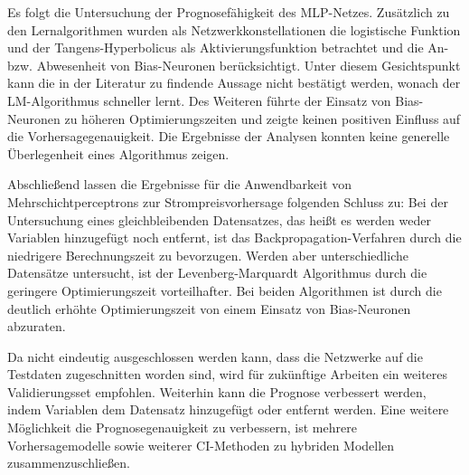 \begin{sloppypar}
Es folgt die Untersuchung der Prognosefähigkeit des MLP-Netzes. Zusätzlich zu den Lernalgorithmen wurden als Netzwerkkonstellationen die logistische Funktion und der Tangens-Hyperbolicus als Aktivierungsfunktion betrachtet und die An- bzw. Abwesenheit von Bias-Neuronen berücksichtigt. Unter diesem Gesichtspunkt kann die in der Literatur zu findende Aussage nicht bestätigt werden, wonach der LM-Algorithmus schneller lernt. Des Weiteren führte der Einsatz von Bias-Neuronen zu höheren Optimierungszeiten und zeigte keinen positiven Einfluss auf die Vorhersagegenauigkeit. Die Ergebnisse der Analysen konnten keine generelle Überlegenheit eines Algorithmus zeigen.\par\medskip  %

\newpage

Abschließend lassen die Ergebnisse für die Anwendbarkeit von Mehrschichtperceptrons zur Strompreisvorhersage folgenden Schluss zu: Bei der Untersuchung eines gleichbleibenden Datensatzes, das heißt es werden weder Variablen hinzugefügt noch entfernt, ist das Backpropagation-Verfahren durch die niedrigere Berechnungszeit zu bevorzugen. Werden aber unterschiedliche Datensätze untersucht, ist der Levenberg-Marquardt Algorithmus durch die geringere Optimierungszeit vorteilhafter. Bei beiden Algorithmen ist durch die deutlich erhöhte Optimierungszeit von einem Einsatz von Bias-Neuronen abzuraten.\par\medskip 

Da nicht eindeutig ausgeschlossen werden kann, dass die Netzwerke auf die Testdaten zugeschnitten worden sind, wird für zukünftige Arbeiten ein weiteres Validierungsset empfohlen. Weiterhin kann die Prognose verbessert werden, indem Variablen dem Datensatz hinzugefügt oder entfernt werden. Eine weitere Möglichkeit die Prognosegenauigkeit zu verbessern, ist mehrere Vorhersagemodelle sowie weiterer CI-Methoden zu hybriden Modellen \hbox{zusammenzuschließen}.\par\medskip 
\end{sloppypar}


